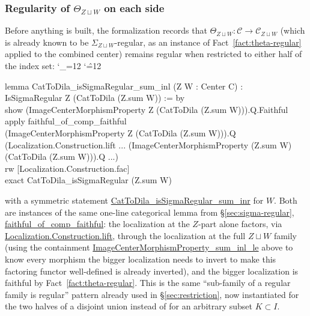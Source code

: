 \documentclass[11pt]{amsart}
\newcommand{\lc}[1]{\url{#1}}
\newenvironment{leancode}{%
  \begingroup
  \catcode`\_=12\relax
  \catcode`\^=12\relax
  \small\ttfamily\raggedright\baselineskip=1.15\baselineskip
  \par\smallskip\noindent
}{%
  \par\smallskip
  \endgroup
}
\theoremstyle{plain}
\theoremstyle{definition}
\theoremstyle{remark}
\newcommand{\calC}{\mathcal C}
\begin{document}
\subsubsection*{Regularity of $\Theta_{Z\sqcup W}$ on each side}
Before anything is built, the formalization records that $\Theta_{Z\sqcup W} : \calC \to
\calC_{Z\sqcup W}$ (which is already known to be $\Sigma_{Z\sqcup W}$-regular, as an
instance of Fact~\ref{fact:theta-regular} applied to the combined center) remains regular
when restricted to either half of the index set:
\begin{leancode}
lemma CatToDila_isSigmaRegular_sum_inl (Z W : Center C) : \\
    IsSigmaRegular Z (CatToDila (Z.sum W)) := by \\
  show (ImageCenterMorphismProperty Z (CatToDila (Z.sum W))).Q.Faithful \\
  apply faithful_of_comp_faithful \\
    (ImageCenterMorphismProperty Z (CatToDila (Z.sum W))).Q \\
    (Localization.Construction.lift ... (ImageCenterMorphismProperty (Z.sum W) \\
      (CatToDila (Z.sum W))).Q ...) \\
  rw [Localization.Construction.fac] \\
  exact CatToDila_isSigmaRegular (Z.sum W) \\
\end{leancode}
with a symmetric statement \lc{CatToDila_isSigmaRegular_sum_inr} for $W$. Both are instances
of the same one-line categorical lemma from \S\ref{sec:sigma-regular},
\lc{faithful_of_comp_faithful}: the localization at the $Z$-part alone factors, via
\lc{Localization.Construction.lift}, through the localization at the full $Z\sqcup W$
family (using the containment \lc{ImageCenterMorphismProperty_sum_inl_le} above to know
every morphism the bigger localization needs to invert to make this factoring functor
well-defined is already inverted), and the bigger localization is faithful by
Fact~\ref{fact:theta-regular}. This is the same ``sub-family of a regular family is regular''
pattern already used in \S\ref{sec:restriction}, now instantiated for
the two halves of a disjoint union instead of for an arbitrary subset $K \subset I$.
\end{document}
